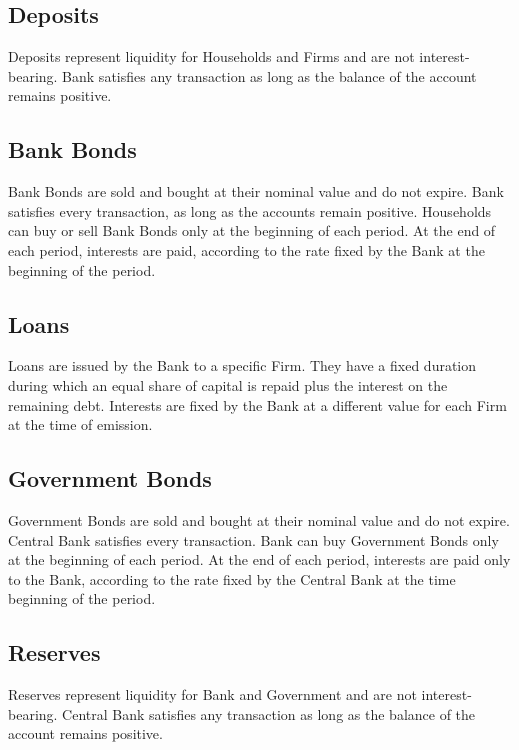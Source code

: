 \documentclass[a4paper, headings=standardclasses]{scrartcl}
\begin{document}
\subsection{Deposits}
Deposits represent liquidity for Households and Firms and are not interest-bearing. Bank satisfies any transaction as long as the balance of the account remains positive.

\subsection{Bank Bonds}
Bank Bonds are sold and bought at their nominal value and do not expire. Bank satisfies every transaction, as long as the accounts remain positive. Households can buy or sell Bank Bonds only at the beginning of each period. At the end of each period, interests are paid, according to the rate fixed by the Bank at the beginning of the period.

\subsection{Loans}
Loans are issued by the Bank to a specific Firm. They have a fixed duration during which an equal share of capital is repaid plus the interest on the remaining debt. Interests are fixed by the Bank at a different value for each Firm at the time of emission.

\subsection{Government Bonds}
Government Bonds are sold and bought at their nominal value and do not expire. Central Bank satisfies every transaction. Bank can buy Government Bonds only at the beginning of each period. At the end of each period, interests are paid only to the Bank, according to the rate fixed by the Central Bank at the time beginning of the period.

\subsection{Reserves}
Reserves represent liquidity for Bank and Government and are not interest-bearing. Central Bank satisfies any transaction as long as the balance of the account remains positive.
\end{document}
